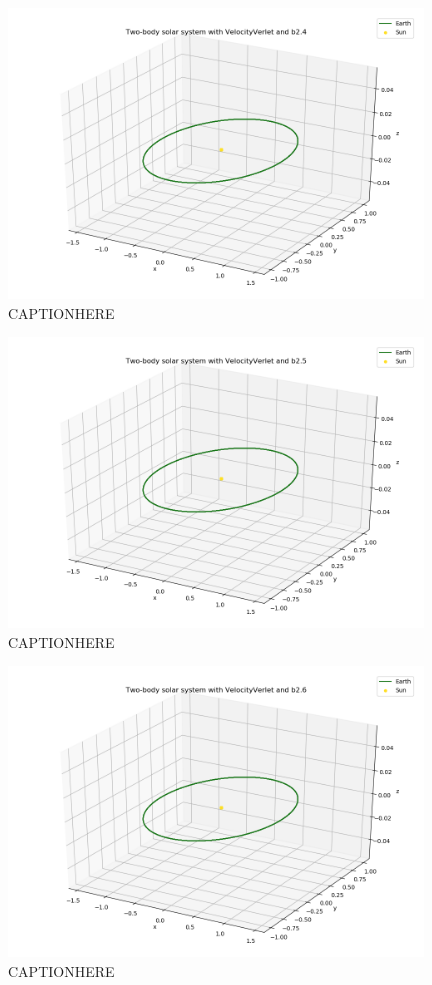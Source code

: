 \documentclass{article}
\begin{document}
    \begin{figure}[H]
        \centering
        \includegraphics[width = 11cm]{img/plot3D_S_E_V_b24.png}
        \caption{CAPTIONHERE}
        \label{fig:plot3D_S_E_V_b24}
    \end{figure}

    \begin{figure}[H]
        \centering
        \includegraphics[width = 11cm]{img/plot3D_S_E_V_b25.png}
        \caption{CAPTIONHERE}
        \label{fig:plot3D_S_E_V_b25}
    \end{figure}

    \begin{figure}[H]
        \centering
        \includegraphics[width = 11cm]{img/plot3D_S_E_V_b26.png}
        \caption{CAPTIONHERE}
        \label{fig:plot3D_S_E_V_b26}
    \end{figure}
\end{document}
